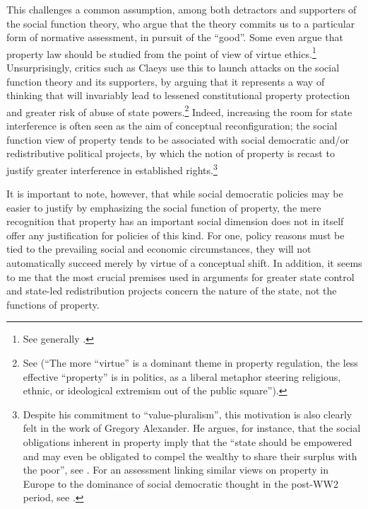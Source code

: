 \documentclass[12pt,a4paper]{book} %
\begin{document}
This challenges a common assumption, among both detractors and supporters of the social function theory, who argue that the theory commits us to a particular form of normative assessment, in pursuit of the ``good''. Some even argue that property law should be studied from the point of view of virtue ethics.\footnote{See generally \cite{penalver09}.} Unsurprisingly, critics such as Claeys use this to launch attacks on the social function theory and its supporters, by arguing that it represents a way of thinking that will invariably lead to lessened constitutional property protection and greater risk of abuse of state powers.\footnote{See \cite{claeys09} (``The more ``virtue'' is a dominant theme in property regulation, the less effective ``property'' is in politics, as a liberal metaphor steering religious, ethnic, or ideological extremism out of the public square'').} Indeed, increasing the room for state interference is often seen as the aim of conceptual reconfiguration; the social function view of property tends to be associated with social democratic and/or redistributive political projects, by which the notion of property is recast to justify greater interference in established rights.\footnote{Despite his commitment to ``value-pluralism'', this motivation is also clearly felt in the work of Gregory Alexander. He argues, for instance, that the social obligations inherent in property imply that the ``state should be empowered and may even be obligated to compel the wealthy to share their surplus with the poor'', see \cite[746]{alexander09}. For an assessment linking similar views on property in Europe to the dominance of social democratic thought in the post-WW2 period, see \cite{allen10}.}

It is important to note, however, that while social democratic policies may be easier to justify by emphasizing the social function of property, the mere recognition that property has an important social dimension does not in itself offer any justification for policies of this kind. For one, policy reasons must be tied to the prevailing social and economic circumstances, they will not automatically succeed merely by virtue of a conceptual shift. In addition, it seems to me that the most crucial premises used in arguments for greater state control and state-led redistribution projects concern the nature of the state, not the functions of property.
\end{document}
